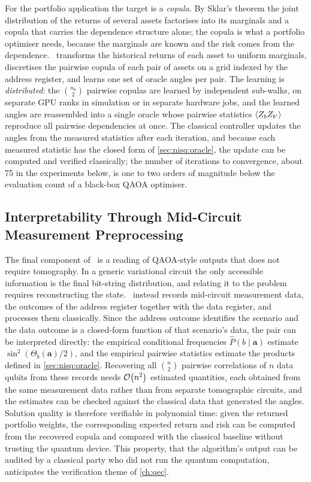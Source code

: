 For the portfolio application the target is a \emph{copula}. By Sklar's theorem \cite{sklar1959copula} the joint distribution of the returns of several assets factorises into its marginals and a copula that carries the dependence structure alone; the copula is what a portfolio optimiser needs, because the marginals are known and the risk comes from the dependence. \qawa\ transforms the historical returns of each asset to uniform marginals, discretises the pairwise copula of each pair of assets on a grid indexed by the address register, and learns one set of oracle angles per pair. The learning is \emph{distributed}: the $\binom{n_{b}}{2}$ pairwise copulas are learned by independent sub-walks, on separate GPU ranks in simulation or in separate hardware jobs, and the learned angles are reassembled into a single oracle whose pairwise statistics $\expval{Z_{b}Z_{b'}}$ reproduce all pairwise dependencies at once. The classical controller updates the angles from the measured statistics after each iteration, and because each measured statistic has the closed form of \cref{sec:nisq:oracle}, the update can be computed and verified classically; the number of iterations to convergence, about 75 in the experiments below, is one to two orders of magnitude below the evaluation count of a black-box QAOA optimiser.

\subsection{Interpretability Through Mid-Circuit Measurement Preprocessing}\label{sec:nisq:interp}

The final component of \qawa\ is a reading of QAOA-style outputs that does not require tomography. In a generic variational circuit the only accessible information is the final bit-string distribution, and relating it to the problem requires reconstructing the state. \qawa\ instead records mid-circuit measurement data, the outcomes of the address register together with the data register, and processes them classically. Since the address outcome identifies the scenario and the data outcome is a closed-form function of that scenario's data, the pair can be interpreted directly: the empirical conditional frequencies $\hat{P}(b\mid\bm{a})$ estimate $\sin^{2}(\Theta_{b}(\bm{a})/2)$, and the empirical pairwise statistics estimate the products defined in \cref{sec:nisq:oracle}. Recovering all $\binom{n}{2}$ pairwise correlations of $n$ data qubits from these records needs $\mathcal{O}\!\left(n^{2}\right)$ estimated quantities, each obtained from the same measurement data rather than from separate tomographic circuits, and the estimates can be checked against the classical data that generated the angles. Solution quality is therefore verifiable in polynomial time: given the returned portfolio weights, the corresponding expected return and risk can be computed from the recovered copula and compared with the classical baseline without trusting the quantum device. This property, that the algorithm's output can be audited by a classical party who did not run the quantum computation, anticipates the verification theme of \cref{ch:qec}.

